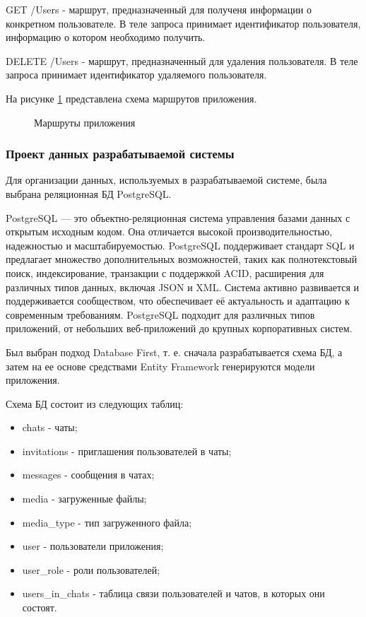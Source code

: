 GET /Users - маршрут, предназначенный для полученя информации о конкретном пользователе. В теле запроса принимает идентификатор пользователя, информацию о котором необходимо получить.

DELETE /Users - маршрут, предназначенный для удаления пользователя. В теле запроса принимает идентификатор удаляемого пользователя.

На рисунке \ref{routes:image} представлена схема маршрутов приложения.

\begin{landscape}
	\begin{figure}[ht]
		\caption{Маршруты приложения}
		\label{routes:image}
	\end{figure}
\end{landscape}

\subsubsection{Проект данных разрабатываемой системы}

Для организации данных, используемых в разрабатываемой системе, была выбрана реляционная БД PostgreSQL. 

PostgreSQL — это объектно-реляционная система управления базами данных с открытым исходным кодом. Она отличается высокой производительностью, надежностью и масштабируемостью. PostgreSQL поддерживает стандарт SQL и предлагает множество дополнительных возможностей, таких как полнотекстовый поиск, индексирование, транзакции с поддержкой ACID, расширения для различных типов данных, включая JSON и XML. Система активно развивается и поддерживается сообществом, что обеспечивает её актуальность и адаптацию к современным требованиям. PostgreSQL подходит для различных типов приложений, от небольших веб-приложений до крупных корпоративных систем.

Был выбран подход Database First\cite{ef}, т. е. сначала разрабатывается схема БД, а затем на ее основе средствами Entity Framework генерируются модели приложения.

Схема БД состоит из следующих таблиц:
\begin{itemize}
	\item chats - чаты;
	\item invitations - приглашения пользователей в чаты;
	\item messages - сообщения в чатах;
	\item media - загруженные файлы;
	\item media\_type - тип загруженного файла;
	\item user - пользователи приложения;
	\item user\_role - роли пользователей;
	\item users\_in\_chats - таблица связи пользователей и чатов, в которых они состоят. 
\end{itemize}

